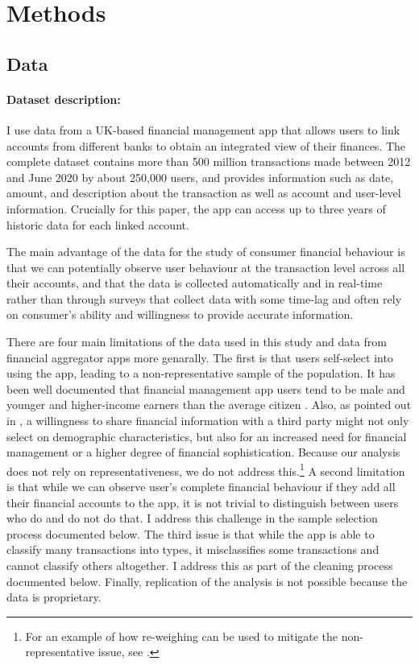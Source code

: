 
\section{Methods}%
\label{sec:data}

\subsection{Data}%
\label{sub:data}

\paragraph{Dataset description:}%
\label{par:dataset_description}

I use data from a UK-based financial management app that allows users to link
accounts from different banks to obtain an integrated view of their finances.
The complete dataset contains more than 500 million transactions made between
2012 and June 2020 by about 250,000 users, and provides information such as
date, amount, and description about the transaction as well as account and
user-level information. Crucially for this paper, the app can access up to
three years of historic data for each linked account.

The main advantage of the data for the study of consumer financial behaviour is
that we can potentially observe user behaviour at the transaction level across
all their accounts, and that the data is collected automatically and in
real-time rather than through surveys that collect data with some time-lag and
often rely on consumer's ability and willingness to provide accurate
information.

There are four main limitations of the data used in this study and data from
financial aggregator apps more genarally\citet{baker2022household}. The first
is that users self-select into using the app, leading to a non-representative
sample of the population. It has been well documented that financial management
app users tend to be male and younger and higher-income earners than the
average citizen \citet{carlin2019generational}. Also, as pointed out in
\citet{gelman2014harnessing}, a willingness to share financial information with
a third party might not only select on demographic characteristics, but also
for an increased need for financial management or a higher degree of financial
sophistication. Because our analysis does not rely on representativeness, we do
not address this.\footnote{For an example of how re-weighing can be used to
mitigate the non-representative issue, see \citet{bourquin2020effects}.} A
second limitation is that while we can observe user's complete financial
behaviour if they add all their financial accounts to the app, it is not
trivial to distinguish between users who do and do not do that. I address this
challenge in the sample selection process documented below. The third issue is
that while the app is able to classify many transactions into types, it
misclassifies some transactions and cannot classify others altogether. I
address this as part of the cleaning process documented below. Finally,
replication of the analysis is not possible because the data is proprietary.


